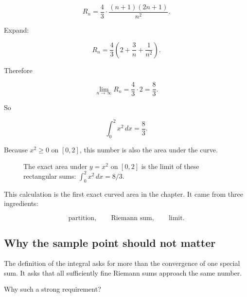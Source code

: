 \[
R_n
=
\frac{4}{3}
\cdot
\frac{(n+1)(2n+1)}{n^2}.
\]

Expand:

\[
R_n
=
\frac{4}{3}
\left(
2+\frac{3}{n}+\frac{1}{n^2}
\right).
\]

Therefore

\[
\lim_{n\to\infty}R_n
=
\frac{4}{3}\cdot2
=
\frac{8}{3}.
\]

So

\[
\boxed{
\int_0^2 x^2\,dx=\frac{8}{3}.
}
\]

Because \(x^2\ge0\) on \([0,2]\), this number is also the area under the curve.

\begin{figure}[h]
\centering
{}
\caption{The exact area under \(y=x^2\) on \([0,2]\) is the limit of these rectangular sums: \(\int_0^2 x^2\,dx=8/3\).}
\label{fig:riemann-x-squared-right}
\end{figure}

This calculation is the first exact curved area in the chapter.  It came from three
ingredients:

\[
\text{partition},
\qquad
\text{Riemann sum},
\qquad
\text{limit}.
\]

\subsection{Why the sample point should not matter}
\label{subsec:why-sample-point-should-not-matter}

The definition of the integral asks for more than the convergence of one special sum.
It asks that all sufficiently fine Riemann sums approach the same number.

Why such a strong requirement?

